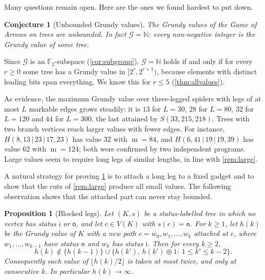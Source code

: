 \documentclass[11pt]{amsart}
\newtheorem{proposition}[theorem]{Proposition}
\newtheorem{conjecture}[theorem]{Conjecture}
\theoremstyle{definition}
\theoremstyle{remark}
\newcommand{\G}{\mathcal{G}}
\newcommand{\m}{\operatorname{m}}
\newcommand{\sn}{\mathsf{n}}
\newcommand{\si}{\mathsf{i}}
\newcommand{\so}{\mathsf{o}}
\newcommand{\Sp}{S}
\newcommand{\NN}{\mathbb{N}}
\begin{document}
Many questions remain open. Here are the ones we found hardest to put down.

\begin{conjecture}[Unbounded Grundy values]\label{conj:unbounded}
The Grundy values of the Game of Arrows on trees are unbounded. In fact $\G=\NN$: every non-negative integer is the Grundy value of some tree.
\end{conjecture}

Since $\G$ is an $\mathbb{F}_2$-subspace (\cref{cor:subgroup}), $\G=\NN$ holds if and only if for every $r\ge0$ some tree has a Grundy value in $[2^r,2^{r+1})$, because elements with distinct leading bits span everything. We know this for $r\le5$ (\cref{thm:allvalues}).

As evidence, the maximum Grundy value over three-legged spiders with legs of at most $L$ markable edges grows steadily: it is $13$ for $L=30$, $28$ for $L=80$, $32$ for $L=120$ and $44$ for $L=300$, the last attained by $\Sp(33,215,218)$. Trees with two branch vertices reach larger values with fewer edges. For instance, $H(8,13\,|\,23\,|\,17,23)$ has value $32$ with $\m=84$, and $H(6,41\,|\,19\,|\,19,39)$ has value $62$ with $\m=124$; both were confirmed by two independent programs. Large values seem to require long legs of similar lengths, in line with \cref{rem:large}.

A natural strategy for proving \cref{conj:unbounded} is to attach a long leg to a fixed gadget and to show that the cuts of \cref{rem:large} produce all small values. The following observation shows that the attached part can never stay bounded.

\begin{proposition}[Blocked legs]\label{prop:blockedleg}
Let $(K,s)$ be a status-labelled tree in which no vertex has status $\si$ or $\so$, and let $c\in V(K)$ with $s(c)=\sn$. For $k\ge1$, let $h(k)$ be the Grundy value of $K$ with a new path $c=w_0,w_1,\dots,w_k$ attached at $c$, where $w_1,\dots,w_{k-1}$ have status $\sn$ and $w_k$ has status $\si$. Then for every $k\ge2$,
\[
  h(k)\notin\{h(k-1)\}\cup\{h(k'),\,h(k')\oplus 1:\ 1\le k'\le k-2\}.
\]
Consequently each value of $\lfloor h(k)/2\rfloor$ is taken at most twice, and only at consecutive $k$. In particular $h(k)\to\infty$.
\end{proposition}
\end{document}
